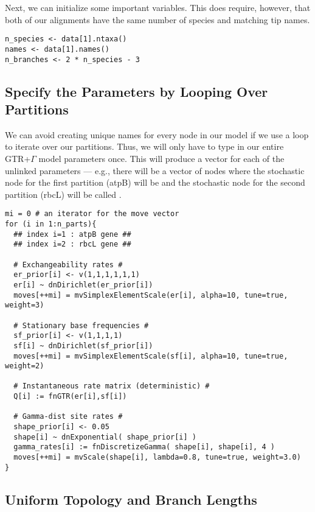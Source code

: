 Next, we can initialize some important variables. This does require, however, that both of our alignments have the same number of species and matching tip names.
{\tt \begin{snugshade*}
\begin{lstlisting}
n_species <- data[1].ntaxa()
names <- data[1].names()
n_branches <- 2 * n_species - 3
\end{lstlisting}
\end{snugshade*}}


\subsection{Specify the Parameters by Looping Over Partitions}

We can avoid creating unique names for every node in our model if we use a  loop to iterate over our partitions. Thus, we will only have to type in our entire GTR+$\Gamma$ model parameters once. 
This will produce a vector for each of the unlinked parameters --- e.g., there will be a vector of  nodes where the stochastic node for the first partition (atpB) will be  and the stochastic node for the second partition (rbcL) will be called .
{\tt \small \begin{snugshade*}
\begin{lstlisting}
mi = 0 # an iterator for the move vector
for (i in 1:n_parts){
  ## index i=1 : atpB gene ##
  ## index i=2 : rbcL gene ##
  
  # Exchangeability rates #
  er_prior[i] <- v(1,1,1,1,1,1)
  er[i] ~ dnDirichlet(er_prior[i])
  moves[++mi] = mvSimplexElementScale(er[i], alpha=10, tune=true, weight=3) 

  # Stationary base frequencies #
  sf_prior[i] <- v(1,1,1,1)
  sf[i] ~ dnDirichlet(sf_prior[i])
  moves[++mi] = mvSimplexElementScale(sf[i], alpha=10, tune=true, weight=2) 

  # Instantaneous rate matrix (deterministic) #
  Q[i] := fnGTR(er[i],sf[i]) 

  # Gamma-dist site rates #
  shape_prior[i] <- 0.05 
  shape[i] ~ dnExponential( shape_prior[i] )
  gamma_rates[i] := fnDiscretizeGamma( shape[i], shape[i], 4 )
  moves[++mi] = mvScale(shape[i], lambda=0.8, tune=true, weight=3.0)
}
\end{lstlisting}
\end{snugshade*}}


\subsection{Uniform Topology and Branch Lengths}

